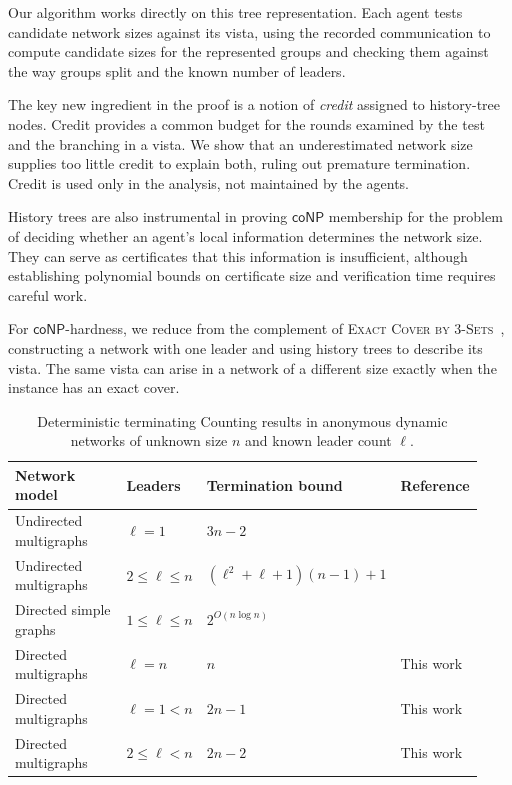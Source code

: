 \documentclass[11pt]{article}
\begin{document}
Our algorithm works directly on this tree representation.
Each agent tests candidate network sizes against its vista, using
the recorded communication to compute candidate sizes for the
represented groups and checking them against the way groups split
and the known number of leaders.

The key new ingredient in the proof is a notion of \emph{credit}
assigned to history-tree nodes. Credit provides a common budget
for the rounds examined by the test and the branching in
a vista. We show that an underestimated network size supplies too
little credit to explain both, ruling out premature termination.
Credit is used only in the analysis, not maintained by the agents.


History trees are also instrumental in proving $\mathsf{coNP}$ membership for the problem of deciding whether an agent's local information determines the network size. They can serve as certificates that this information is insufficient, although establishing polynomial bounds on certificate size and verification time requires careful work.

For $\mathsf{coNP}$-hardness, we reduce from the complement of
\textsc{Exact Cover by 3-Sets}~\cite{GJ79}, constructing a network with one leader and
using history trees to describe its vista.
The same vista can arise in a network of a different size exactly
when the instance has an exact cover.

\begin{table}[tbp]
\centering
\footnotesize
\setlength{\tabcolsep}{5pt}
\renewcommand{\arraystretch}{1.25}
\begin{tabular}{@{}p{0.26\linewidth}p{0.16\linewidth}p{0.34\linewidth}p{0.17\linewidth}@{}}
\hline
\textbf{Network model} & \textbf{Leaders} &
\textbf{Termination bound} & \textbf{Reference} \\
\hline
Undirected multigraphs & \(\ell=1\) &
\(3n-2\) & \cite{DV22} \\
Undirected multigraphs & \(2\leq\ell\leq n\) &
\((\ell^2+\ell+1)(n-1)+1\) & \cite{DLV26} \\
Directed simple graphs & \(1\leq\ell\leq n\) &
\(2^{O(n\log n)}\) & \cite{VIG24} \\
\hline
Directed multigraphs & \(\ell=n\) &
\(n\) & This work \\
Directed multigraphs & \(\ell=1<n\) &
\(2n-1\) & This work \\
Directed multigraphs & \(2\leq\ell<n\) &
\(2n-2\) & This work \\
\hline
\end{tabular}
\caption{Deterministic terminating Counting results in anonymous dynamic networks of unknown size \(n\)
and known leader count \(\ell\).}
\label{tab:proposed-counting-bounds}
\end{table}
\end{document}
